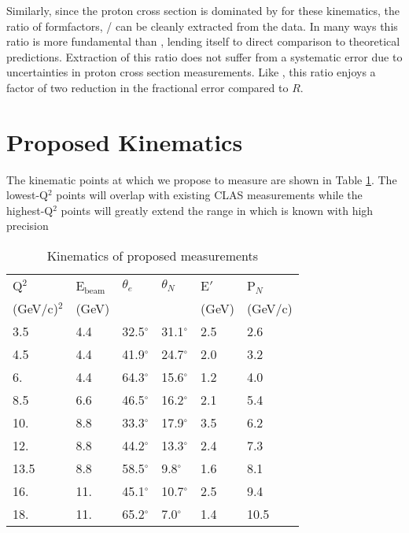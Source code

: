 \documentclass[12pt,letterpaper,oneside]{article}
\begin{document}
Similarly, since the proton cross section is dominated by \gmp
for these kinematics, the ratio of formfactors,
\gmnc/\gmp
can be cleanly extracted from the data.  In many ways this ratio is
more fundamental than \gmnc, lending itself to direct comparison to
theoretical predictions.  Extraction of this ratio does not suffer
from a systematic error due to uncertainties in proton cross section
measurements. Like \gmnc, this ratio enjoys a factor of two reduction
in the fractional error compared to $R$.

\section{Proposed Kinematics}
The kinematic points at which we propose to measure are shown in Table
\ref{Kin_table}.  The lowest-Q$^2$ points will overlap with existing
CLAS measurements while the highest-Q$^2$ points will greatly extend
the range in which \gmn is known with high precision

\begin{table}
\begin{center}
\caption{Kinematics of proposed measurements \label{Kin_table}}
\vspace{.2in}
{\begin{tabular}{|l|l|l|l|l|l|}
\hline
Q$^2$ & E$_{\mbox{beam}}$ & $\theta_e$ & $\theta_N$ & E$'$ & P$_N$ \\
(GeV/c)$^2$ & (GeV) & & & (GeV) & (GeV/c)\\
\hline
3.5 & 4.4& 32.5$^\circ$&31.1$^\circ$ & 2.5 & 2.6\\
4.5 & 4.4& 41.9$^\circ$&24.7$^\circ$ & 2.0 & 3.2\\
6. & 4.4& 64.3$^\circ$&15.6$^\circ$ & 1.2 & 4.0\\
8.5 & 6.6& 46.5$^\circ$&16.2$^\circ$ & 2.1 & 5.4\\
10. & 8.8& 33.3$^\circ$&17.9$^\circ$ & 3.5 & 6.2\\
12. & 8.8& 44.2$^\circ$&13.3$^\circ$ & 2.4 & 7.3\\
13.5 & 8.8& 58.5$^\circ$&9.8$^\circ$ & 1.6 & 8.1\\
16. & 11.& 45.1$^\circ$&10.7$^\circ$ & 2.5 & 9.4\\
18. & 11.& 65.2$^\circ$&7.0$^\circ$ & 1.4 & 10.5\\
\hline
\end{tabular}}
\end{center}
\end{table}
\end{document}
